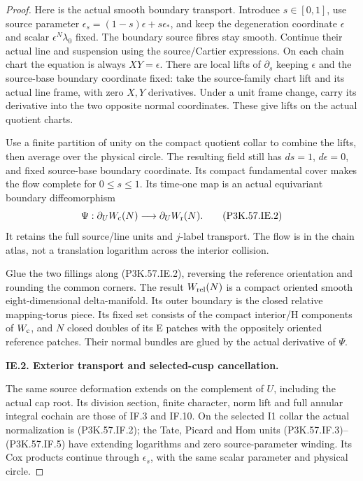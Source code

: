 \begin{proof}
Here is the actual smooth boundary transport. Introduce
\(s\in[0,1]\), use source parameter
\(\epsilon_s=(1-s)\epsilon+s\epsilon_*\), and keep the
degeneration coordinate \(\epsilon\) and scalar
\(\epsilon^N\lambda_0\) fixed. The boundary source fibres
stay smooth. Continue their actual line and suspension
using the source/Cartier expressions. On each chain chart
the equation is always \(XY=\epsilon\). There are local
lifts of \(\partial_s\) keeping \(\epsilon\) and the
source-base boundary coordinate fixed: take the
source-family chart lift and its actual line frame,
with zero \(X,Y\) derivatives. Under a unit frame change,
carry its derivative into the two opposite normal
coordinates. These give lifts on the actual quotient
charts.

Use a finite partition of unity on the compact quotient
collar to combine the lifts, then average over the physical
circle. The resulting field still has \(ds=1\),
\(d\epsilon=0\), and fixed source-base boundary coordinate.
Its compact fundamental cover makes the flow complete for
\(0\le s\le1\). Its time-one map is an actual equivariant
boundary diffeomorphism
\[
        \Psi:\partial_U W_{\rm c}(N)
                   \longrightarrow\partial_U W_{\rm r}(N).   \tag{P3K.57.IE.2}
\]
It retains the full source/line units and \(j\)-label
transport. The flow is in the chain atlas, not a
translation logarithm across the interior collision.

Glue the two fillings along (P3K.57.IE.2), reversing the reference
orientation and rounding the common corners. The result
\(W_{\rm rel}(N)\) is a compact oriented smooth
eight-dimensional delta-manifold. Its outer boundary is
the closed relative mapping-torus piece. Its fixed set
consists of the compact interior/H components of
\(W_{\rm c}\), and \(N\) closed doubles of its E patches
with the oppositely oriented reference patches. Their
normal bundles are glued by the actual derivative of
\(\Psi\).

\par\medskip\noindent\textbf{IE.2. Exterior transport and selected-cusp cancellation.}\par\nopagebreak[4]

The same source deformation extends on the complement
of \(U\), including the actual cap root. Its division
section, finite character, norm lift and full annular
integral cochain are those of IF.3 and IF.10. On the
selected I1 collar the actual normalization is (P3K.57.IF.2);
the Tate, Picard and Hom units (P3K.57.IF.3)--\allowbreak (P3K.57.IF.5) have
extending logarithms and zero source-parameter winding.
Its Cox products continue through \(\epsilon_s\), with
the same scalar parameter and physical circle.


\end{proof}
